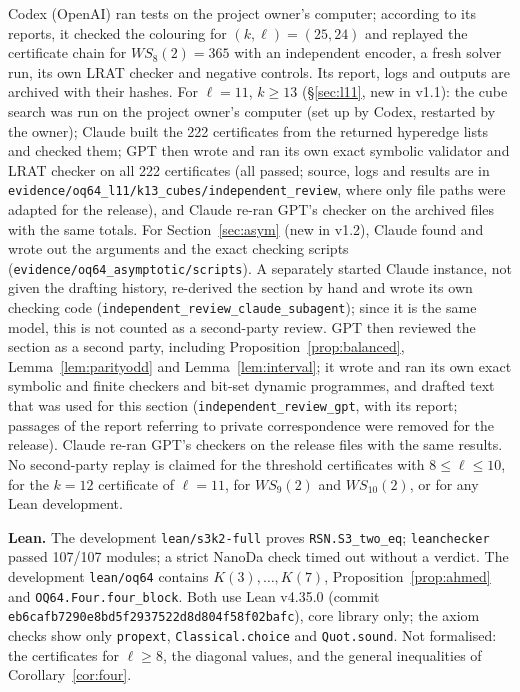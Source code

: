 \documentclass[11pt]{amsart}
\theoremstyle{definition}
\begin{document}
Codex (OpenAI) ran tests on the project owner's computer; according to its reports, it checked the colouring for $(k,\ell)=(25,24)$ and replayed the certificate chain for $WS_8(2)=365$ with an independent encoder, a fresh solver run, its own LRAT checker and negative controls. Its report, logs and outputs are archived with their hashes. For $\ell=11$, $k\ge13$ (\S\ref{sec:l11}, new in v1.1): the cube search was run on the project owner's computer (set up by Codex, restarted by the owner); Claude built the 222 certificates from the returned hyperedge lists and checked them; GPT then wrote and ran its own exact symbolic validator and LRAT checker on all 222 certificates (all passed; source, logs and results are in \texttt{evidence/oq64\_l11/k13\_cubes/independent\_review}, where only file paths were adapted for the release), and Claude re-ran GPT's checker on the archived files with the same totals. For Section~\ref{sec:asym} (new in v1.2), Claude found and wrote out the arguments and the exact checking scripts (\texttt{evidence/oq64\_asymptotic/scripts}). A separately started Claude instance, not given the drafting history, re-derived the section by hand and wrote its own checking code (\texttt{independent\_review\_claude\_subagent}); since it is the same model, this is not counted as a second-party review. GPT then reviewed the section as a second party, including Proposition~\ref{prop:balanced}, Lemma~\ref{lem:parityodd} and Lemma~\ref{lem:interval}; it wrote and ran its own exact symbolic and finite checkers and bit-set dynamic programmes, and drafted text that was used for this section (\texttt{independent\_review\_gpt}, with its report; passages of the report referring to private correspondence were removed for the release). Claude re-ran GPT's checkers on the release files with the same results. No second-party replay is claimed for the threshold certificates with $8\le\ell\le10$, for the $k=12$ certificate of $\ell=11$, for $WS_9(2)$ and $WS_{10}(2)$, or for any Lean development.


\smallskip\noindent\textbf{Lean.} The development \texttt{lean/s3k2-full} proves \texttt{RSN.S3\_two\_eq}; \texttt{leanchecker} passed 107/107 modules; a strict NanoDa check timed out without a verdict. The development \texttt{lean/oq64} contains $K(3),\dots,K(7)$, Proposition~\ref{prop:ahmed} and \texttt{OQ64.Four.four\_block}. Both use Lean v4.35.0 (commit \texttt{eb6cafb7290e8bd5f2937522d8d804f58f02bafc}), core library only; the axiom checks show only \texttt{propext}, \texttt{Classical.choice} and \texttt{Quot.sound}. Not formalised: the certificates for $\ell\ge8$, the diagonal values, and the general inequalities of Corollary~\ref{cor:four}.
\end{document}
